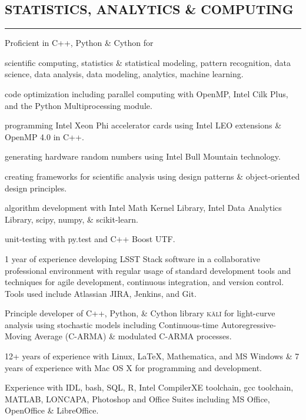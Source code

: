 \documentclass[10pt,a4]{article}
\newcounter{myEnumCounter}
\newcounter{mySaveCounter}
\renewenvironment{enumerate}{%
  \begin{list}{\arabic{myEnumCounter}.}{\usecounter{myEnumCounter}%
  \setcounter{myEnumCounter}{\value{mySaveCounter}}}
  }{%
  \setcounter{mySaveCounter}{\value{myEnumCounter}}\end{list}%
}
\newcommand\myEnumReset{\setcounter{mySaveCounter}{0}}
\begin{document}
\subsection*{STATISTICS, ANALYTICS \& COMPUTING}
\hrule  height 4pt
\vspace{0.2cm}
\begin{itemize}
\item Proficient in C++, Python \& Cython for
	\begin{enumerate}
		\item scientific computing, statistics \& statistical modeling, pattern recognition, data science, data analysis, data modeling, analytics, machine learning.
		\item code optimization including parallel computing with OpenMP, Intel Cilk Plus, and the Python Multiprocessing module.
		\item programming Intel Xeon Phi accelerator cards using Intel LEO extensions \& OpenMP 4.0 in C++.
		\item generating hardware random numbers using Intel Bull Mountain technology.
    \item creating frameworks for scientific analysis using design patterns \& object-oriented design principles.
    \item algorithm development with Intel Math Kernel Library, Intel Data Analytics Library, scipy, numpy, \& scikit-learn.
    \item unit-testing with py.test and C++ Boost UTF.
	\end{enumerate}
\item 1 year of experience developing LSST Stack software in a collaborative professional environment with regular usage of standard development tools and techniques for agile development, continuous integration, and version control. Tools used include Atlassian JIRA, Jenkins, and Git.
\item Principle developer of C++, Python, \& Cython library \textsc{k\={a}l\={i}} for light-curve analysis using stochastic models including Continuous-time Autoregressive-Moving Average (C-ARMA) \& modulated C-ARMA processes.
\item 12+ years of experience with Linux, \LaTeX, Mathematica, and MS Windows \& 7 years of experience with Mac OS X for programming and development.
\item Experience with IDL, bash, SQL, R, Intel CompilerXE toolchain, gcc toolchain, MATLAB, LONCAPA, Photoshop and Office Suites including MS Office, OpenOffice \& LibreOffice.
\end{itemize}
\myEnumReset
\end{document}
